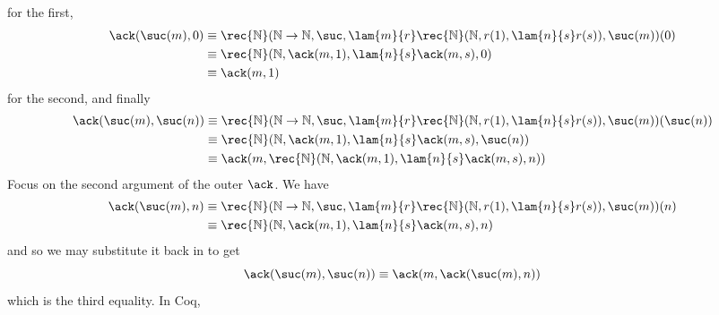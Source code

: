 for the first,
\begin{align*}
\ack(\suc(m), 0)
&\equiv 
\rec{\mathbb{N}}(\mathbb{N} \to \mathbb{N}, 
\suc,
\lam{m}{r}\rec{\mathbb{N}}(\mathbb{N}, 
r(1), 
\lam{n}{s}r(s)),
\suc(m)
)
(0)
\\&\equiv
\rec{\mathbb{N}}(\mathbb{N}, \ack(m, 1), \lam{n}{s}\ack(m, s), 0)
\\&\equiv
\ack(m, 1)
\end{align*}
for the second, and finally
\begin{align*}
\ack(\suc(m), \suc(n))
&\equiv 
\rec{\mathbb{N}}(\mathbb{N} \to \mathbb{N}, 
\suc,
\lam{m}{r}\rec{\mathbb{N}}(\mathbb{N}, 
r(1), 
\lam{n}{s}r(s)),
\suc(m)
)
(\suc(n))
\\&\equiv
\rec{\mathbb{N}}(\mathbb{N}, \ack(m, 1), \lam{n}{s}\ack(m, s), \suc(n))
\\&\equiv
\ack(m, \rec{\mathbb{N}}(\mathbb{N}, \ack(m, 1), \lam{n}{s}\ack(m, s), n))
\end{align*}
Focus on the second argument of the outer $\ack$.  We have
    \begin{align*}
    \ack(\suc(m), n) 
    &\equiv
    \rec{\mathbb{N}}(\mathbb{N} \to \mathbb{N}, 
    \suc,
    \lam{m}{r}\rec{\mathbb{N}}(\mathbb{N}, 
    r(1), 
    \lam{n}{s}r(s)),
    \suc(m)
    )
    (n)
    \\&\equiv
    \rec{\mathbb{N}}(\mathbb{N}, \ack(m, 1), \lam{n}{s}\ack(m,s), n)
    \end{align*}
    and so we may substitute it back in to get
    \[
    \ack(\suc(m), \suc(n))
    \equiv
    \ack(m, \ack(\suc(m), n))
    \]
    which is the third equality.  In Coq,

